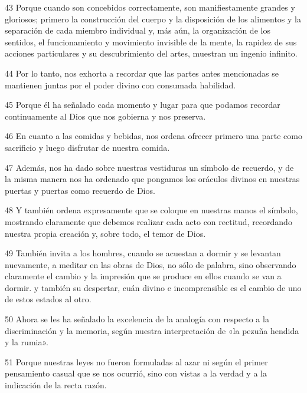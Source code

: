 \par 43 Porque cuando son concebidos correctamente, son manifiestamente grandes y gloriosos; primero la construcción del cuerpo y la disposición de los alimentos y la separación de cada miembro individual y, más aún, la organización de los sentidos, el funcionamiento y movimiento invisible de la mente, la rapidez de sus acciones particulares y su descubrimiento del artes, muestran un ingenio infinito.

\par 44 Por lo tanto, nos exhorta a recordar que las partes antes mencionadas se mantienen juntas por el poder divino con consumada habilidad.

\par 45 Porque él ha señalado cada momento y lugar para que podamos recordar continuamente al Dios que nos gobierna y nos preserva.

\par 46 En cuanto a las comidas y bebidas, nos ordena ofrecer primero una parte como sacrificio y luego disfrutar de nuestra comida.

\par 47 Además, nos ha dado sobre nuestras vestiduras un símbolo de recuerdo, y de la misma manera nos ha ordenado que pongamos los oráculos divinos en nuestras puertas y puertas como recuerdo de Dios.

\par 48 Y también ordena expresamente que se coloque en nuestras manos el símbolo, mostrando claramente que debemos realizar cada acto con rectitud, recordando nuestra propia creación y, sobre todo, el temor de Dios.

\par 49 También invita a los hombres, cuando se acuestan a dormir y se levantan nuevamente, a meditar en las obras de Dios, no sólo de palabra, sino observando claramente el cambio y la impresión que se produce en ellos cuando se van a dormir. y también su despertar, cuán divino e incomprensible es el cambio de uno de estos estados al otro.

\par 50 Ahora se les ha señalado la excelencia de la analogía con respecto a la discriminación y la memoria, según nuestra interpretación de «la pezuña hendida y la rumia».

\par 51 Porque nuestras leyes no fueron formuladas al azar ni según el primer pensamiento casual que se nos ocurrió, sino con vistas a la verdad y a la indicación de la recta razón.

